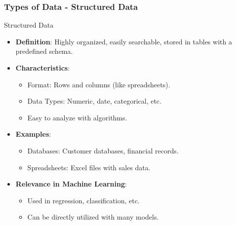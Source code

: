 \documentclass[aspectratio=169]{beamer}
\begin{document}
\begin{frame}[fragile]
    \frametitle{Types of Data - Structured Data}
    \begin{block}{Structured Data}
        \begin{itemize}
            \item \textbf{Definition}: Highly organized, easily searchable, stored in tables with a predefined schema.
            \item \textbf{Characteristics}:
            \begin{itemize}
                \item Format: Rows and columns (like spreadsheets).
                \item Data Types: Numeric, date, categorical, etc.
                \item Easy to analyze with algorithms.
            \end{itemize}
            \item \textbf{Examples}:
            \begin{itemize}
                \item Databases: Customer databases, financial records.
                \item Spreadsheets: Excel files with sales data.
            \end{itemize}
            \item \textbf{Relevance in Machine Learning}:
            \begin{itemize}
                \item Used in regression, classification, etc.
                \item Can be directly utilized with many models.
            \end{itemize}
        \end{itemize}
    \end{block}
\end{frame}
\end{document}
